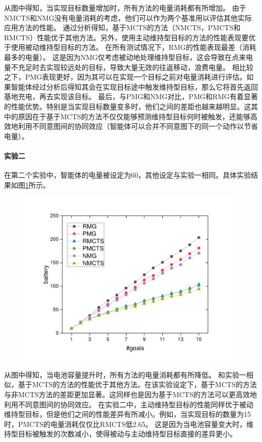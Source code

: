从图中得知，当实现目标数量增加时，所有方法的电量消耗都有所增加。
由于NMCTS和NMG没有电量消耗的考虑，他们可以作为两个基准用以评估其他实际应用方法的性能。
通过分析得知，基于MCTS的方法（NMCTS，PMCTS和RMCTS）性能优于其他方法。另外，使用主动维持型目标的方法的性能表现要优于使用被动维持型目标的方法。
在所有测试情况下，RMG的性能表现最差（消耗最多的电量）。
这是因为NMG仅考虑被动地处理维持型目标，这会导致在点来电量不充足时去实现较远处的目标，导致大量无效的往返移动，浪费电量。
相比较之下，PMG表现更好，因为其可以在实现一个目标之前对电量消耗进行评估。如果智能体经过分析后得知其会在实现目标途中触发维持型目标，那么它将首先返回基地充电，再去实现该目标。
最后，与PMG和NMG对比，PMG和RMG有着显著的性能优势。特别是当实现目标数量变多时，他们之间的差距也越来越明显。这其中的原因在于基于MCTS的方法不仅仅能够预测维持型目标何时被触发，还能够高效地利用不同意图间的协同效应（智能体可以合并不同意图下的同一个动作以节省电量）。


\paragraph{实验二}
在第二个实验中，智能体的电量被设定为60，其他设定与实验一相同。具体实验结果如图\ref{fig:static2}所示。
\begin{figure}[h!]
\centering
\includegraphics[scale=0.4]{./figs/gX_cY_fixCap60.pdf}
\captionsetup{justification=centering}
\label{fig:static2}
\end{figure}

从图中得知，当电池容量提升时，所有方法的电量消耗都有所降低。
%
和实验一相似，基于MCTS的方法的性能优于其他方法。在该实验设定下，基于MCTS的方法与非MCTS方法的差距更加显著。这同样也是因为基于MCTS的方法可以更高效地利用不同意图间的协同效应。
%
在实验二中，主动维持型目标的性能同样优于被动维持型目标，但是他们之间的性能差异有所减小。例如，当实现目标的数量为15时，PMCTS的电量消耗仅仅比RMCTS低2.65。
%
这是因为当电池容量变大时，维持型目标被触发的次数减小，使得被动与主动维持型目标直接的差异更小。

